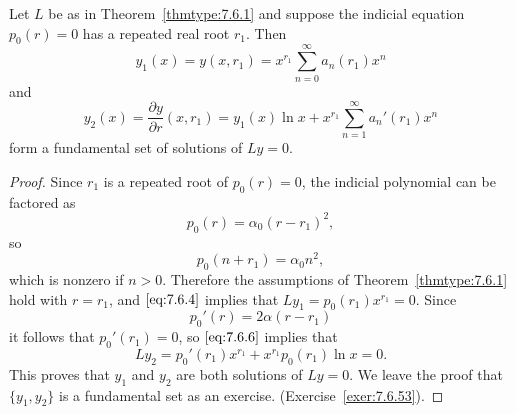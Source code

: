\documentclass{ximera}
\begin{document}
\begin{theorem}\label{thmtype:7.6.2}
Let $L$ be as in Theorem~\ref{thmtype:7.6.1} and suppose the
indicial equation $p_0(r)=0$ has a repeated real root $r_1$.
Then
$$
y_1(x)=y(x,r_1)=x^{r_1}\sum_{n=0}^\infty a_n(r_1)x^n
$$
and
\begin{equation} \label{eq:7.6.8}
y_2(x)=\frac{\partial y}{\partial r}(x,r_1)=y_1(x)\ln
x+x^{r_1}\sum_{n=1}^\infty a_n'(r_1)x^n
\end{equation}
form a fundamental set of solutions of $Ly=0.$
\end{theorem}

\begin{proof}
Since $r_1$  is a repeated root of $p_0(r)=0$, the indicial polynomial
can be factored as
$$
p_0(r)=\alpha_0(r-r_1)^2,
$$
so
$$
p_0(n+r_1)=\alpha_0n^2,
$$
which is nonzero if $n>0$. Therefore the assumptions of
Theorem~\ref{thmtype:7.6.1} hold with $r=r_1$, and $\eqref{eq:7.6.4}$ implies
that $Ly_1=p_0(r_1)x^{r_1}=0$. Since
$$
p_0'(r)=2\alpha(r-r_1)
$$
it follows that $p_0'(r_1)=0$, so $\eqref{eq:7.6.6}$ implies that
$$
Ly_2=p_0'(r_1)x^{r_1}+x^{r_1}p_0(r_1)\ln x=0.
$$
This proves that $y_1$ and $y_2$ are both solutions of $Ly=0$. We
leave the proof that $\{y_1,y_2\}$ is a fundamental set as an exercise.
(Exercise~\ref{exer:7.6.53}).
\end{proof}
\end{document}
